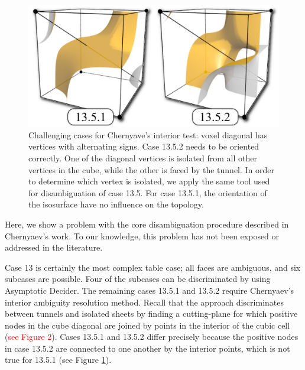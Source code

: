\begin{figure}
     \centering
     \includegraphics[width=0.8\linewidth]{chapter4/figures/case-13.png}
     \caption{Challenging cases for Chernyave's interior test: voxel diagonal has vertices with alternating signs. Case 13.5.2 needs to be oriented correctly. One of the diagonal vertices is isolated from all other vertices in the cube, while the other is faced by the tunnel. In order to determine which vertex is isolated, we apply the same tool used for disambiguation of case 13.5. For case 13.5.1, the orientation of the isosurface have no influence on the topology. }
     \label{fig:case13}
\end{figure}

Here, we show a problem with the core disambiguation procedure described in Chernyaev's work. To our knowledge, this problem has not been exposed or addressed in the literature.

Case 13 is certainly the most complex table case; all faces are ambiguous, and six subcases are possible. Four of the subcases can be discriminated by using Asymptotic Decider. The remaining cases 13.5.1 and 13.5.2 require Chernyaev's \mc{} interior ambiguity resolution method.
%
Recall that the \mc{} approach discriminates between tunnels and isolated sheets by finding a cutting-plane for which positive nodes in the cube diagonal are joined by points in the interior of the cubic cell (\textcolor{red}{see Figure 2}). 
Cases 13.5.1 and 13.5.2 differ precisely because the positive nodes in case 13.5.2 are connected to one another by the interior points, which is not true for 13.5.1 (see Figure \ref{fig:case13}).


